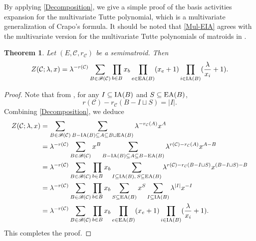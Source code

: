 \documentclass[12pt]{article}%
\renewcommand*{\bm}[1]{#1}%
\numberwithin{equation}{section}
\newtheorem{theorem}{Theorem}[section]
\begin{document}
By applying \autoref{Decomposition}, we give a simple proof of the basis activities expansion for the multivariate Tutte polynomial, which is a multivariate generalization of Crapo's formula. It should be noted that \autoref{Mul-EIA} agrees with the multivariate version for the multivariate Tutte polynomials of matroids in \cite[Corollary 4.7]{BM2014}. 
\begin{theorem}\label{Mul-EIA}
Let $(E,\mathcal{C},r_{\mathcal{C}})$ be a semimatroid. Then
\[
Z(\mathcal{C};\lambda,\bm x)=\lambda^{-r(\mathcal{C})}\sum_{B\in\mathscr{B}(\mathcal{C})}\prod_{b\in B}x_b\prod_{e\in {\rm EA}(B)}(x_e+1)\prod_{i\in {\rm IA}(B)}(\frac{\lambda}{x_i}+1).
\]
\end{theorem}
\begin{proof}
Note that from \cite[Lemma 9.12]{Ardila2007}, for any $I\subseteq{\rm IA}(B)$ and $S\subseteq{\rm EA}(B)$,
\[
r(\mathcal{C})-r_\mathcal{C}(B-I\sqcup S)=|I|.
\]
Combining  \autoref{Decomposition}, we deduce 
\begin{align*}
Z(\mathcal{C};\lambda,\bm x)&=\sum_{B\in\mathscr{B}(\mathcal{C})}\sum_{B-{\rm IA}(B)\subseteq A\subseteq B\sqcup{\rm EA}(B)}\lambda^{-r_\mathcal{C}(A)}\bm x^A\\
&=\lambda^{-r(\mathcal{C})}\sum_{B\in\mathscr{B}(\mathcal{C})}\bm x^B\sum_{B-{\rm IA}(B)\subseteq A\subseteq B-{\rm EA}(B)}\lambda^{r(\mathcal{C})-r_\mathcal{C}(A)}\bm x^{A-B}\\
&=\lambda^{-r(\mathcal{C})}\sum_{B\in\mathscr{B}(\mathcal{C})}\prod_{b\in B}x_b\sum_{I\subseteq{\rm IA}(B),\,S\subseteq{\rm EA}(B)}
\lambda^{r(\mathcal{C})-r_\mathcal{C}(B-I\sqcup S)}\bm x^{(B-I\sqcup S)-B}\\
&=\lambda^{-r(\mathcal{C})}\sum_{B\in\mathscr{B}(\mathcal{C})}\prod_{b\in B}x_b\sum_{S\subseteq{\rm EA}(B)}
\bm x^S\sum_{I\subseteq{\rm IA}(B)}\lambda^{|I|}\bm x^{-I}\\
&=\lambda^{-r(\mathcal{C})}\sum_{B\in\mathscr{B}(\mathcal{C})}\prod_{b\in B}x_b\prod_{e\in {\rm EA}(B)}(x_e+1)\prod_{i\in {\rm IA}(B)}(\frac{\lambda}{x_i}+1).
\end{align*}
This completes the proof.
\end{proof}
\end{document}
